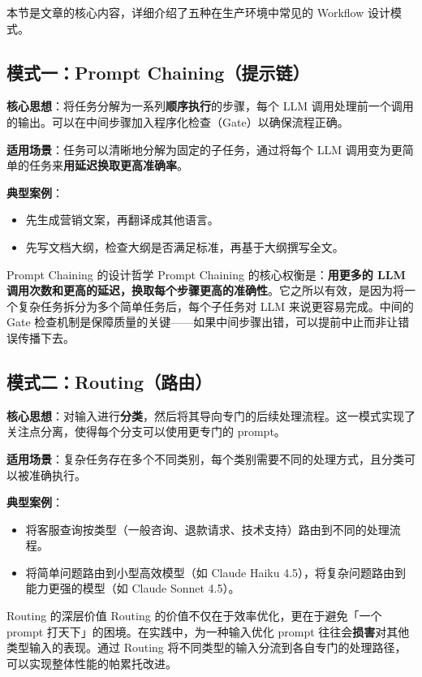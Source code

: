 \documentclass[a4paper]{article}
\begin{document}
本节是文章的核心内容，详细介绍了五种在生产环境中常见的 Workflow 设计模式。

\subsection{模式一：Prompt Chaining（提示链）}

\textbf{核心思想}：将任务分解为一系列\textbf{顺序执行}的步骤，每个 LLM 调用处理前一个调用的输出。可以在中间步骤加入程序化检查（Gate）以确保流程正确。

\textbf{适用场景}：任务可以清晰地分解为固定的子任务，通过将每个 LLM 调用变为更简单的任务来\textbf{用延迟换取更高准确率}。

\textbf{典型案例}：
\begin{itemize}
    \item 先生成营销文案，再翻译成其他语言。
    \item 先写文档大纲，检查大纲是否满足标准，再基于大纲撰写全文。
\end{itemize}

\begin{importantbox}{Prompt Chaining 的设计哲学}
Prompt Chaining 的核心权衡是：\textbf{用更多的 LLM 调用次数和更高的延迟，换取每个步骤更高的准确性}。它之所以有效，是因为将一个复杂任务拆分为多个简单任务后，每个子任务对 LLM 来说更容易完成。中间的 Gate 检查机制是保障质量的关键——如果中间步骤出错，可以提前中止而非让错误传播下去。
\end{importantbox}

\subsection{模式二：Routing（路由）}

\textbf{核心思想}：对输入进行\textbf{分类}，然后将其导向专门的后续处理流程。这一模式实现了关注点分离，使得每个分支可以使用更专门的 prompt。

\textbf{适用场景}：复杂任务存在多个不同类别，每个类别需要不同的处理方式，且分类可以被准确执行。

\textbf{典型案例}：
\begin{itemize}
    \item 将客服查询按类型（一般咨询、退款请求、技术支持）路由到不同的处理流程。
    \item 将简单问题路由到小型高效模型（如 Claude Haiku 4.5），将复杂问题路由到能力更强的模型（如 Claude Sonnet 4.5）。
\end{itemize}

\begin{knowledgebox}{Routing 的深层价值}
Routing 的价值不仅在于效率优化，更在于避免「一个 prompt 打天下」的困境。在实践中，为一种输入优化 prompt 往往会\textbf{损害}对其他类型输入的表现。通过 Routing 将不同类型的输入分流到各自专门的处理路径，可以实现整体性能的帕累托改进。
\end{knowledgebox}
\end{document}
